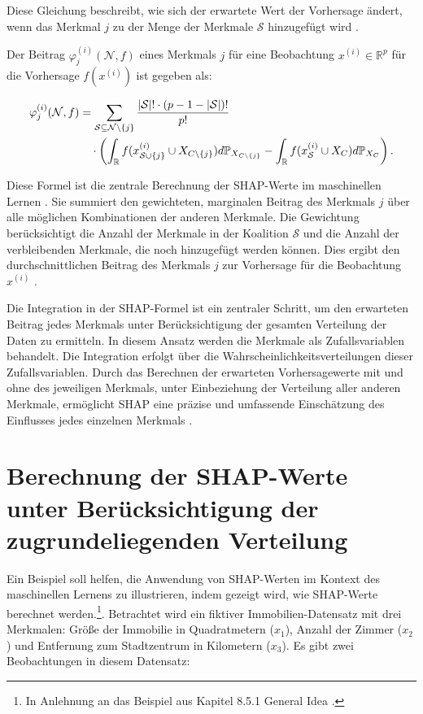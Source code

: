 Diese Gleichung beschreibt, wie sich der erwartete Wert der Vorhersage ändert, wenn das Merkmal $j$ zu der Menge der Merkmale $\mathcal{S}$ hinzugefügt wird \cite[S. 29]{Molnar_2023}.

Der Beitrag $\varphi_j^{(i)}(\mathcal{N}, f)$ eines Merkmals $j$ für eine Beobachtung $x^{(i)} \in \mathbb{R}^{p}$ für die Vorhersage $f(x^{(i)})$ ist gegeben als:

\begin{align}
    \label{eq:shap-eq}
    \varphi^{(i)}_{j} (\mathcal{N}, f) &= \sum_{\mathcal{S} \subseteq \mathcal{N} \setminus \{j\}} \frac{|\mathcal{S}|! \cdot (p - 1 - |\mathcal{S}|)!}{p!} \\ \notag
    &\quad \cdot \left( \int_{\mathbb{R}} f(x^{(i)}_{\mathcal{S} \cup \{j\}} \cup X_{C \setminus \{j\}}) d\mathbb{P}_{X_{C \setminus \{j\}}} -
    \int_{\mathbb{R}} f(x^{(i)}_{\mathcal{S}} \cup X_{C}) d\mathbb{P}_{X_{C}} \right).
\end{align}

Diese Formel ist die zentrale Berechnung der SHAP-Werte im maschinellen Lernen \cite[S. 29]{Molnar_2023}. 
Sie summiert den gewichteten, marginalen Beitrag des Merkmals $j$ über alle möglichen Kombinationen der anderen Merkmale. 
Die Gewichtung berücksichtigt die Anzahl der Merkmale in der Koalition $\mathcal{S}$ und die Anzahl der verbleibenden Merkmale, 
die noch hinzugefügt werden können. Dies ergibt den durchschnittlichen Beitrag des Merkmals $j$ zur Vorhersage für die 
Beobachtung $x^{(i)}$ \cite[S. 30]{Molnar_2023}.

Die Integration in der SHAP-Formel ist ein zentraler Schritt, um den erwarteten Beitrag jedes Merkmals unter 
Berücksichtigung der gesamten Verteilung der Daten zu ermitteln. 
In diesem Ansatz werden die Merkmale als Zufallsvariablen behandelt. Die Integration erfolgt über 
die Wahrscheinlichkeitsverteilungen dieser Zufallsvariablen.
Durch das Berechnen der erwarteten Vorhersagewerte mit 
und ohne des jeweiligen Merkmals, unter Einbeziehung der Verteilung aller anderen Merkmale, 
ermöglicht SHAP eine präzise und umfassende Einschätzung des Einflusses jedes einzelnen Merkmals \cite[S. 28]{Molnar_2023}.


\section{Berechnung der SHAP-Werte unter Berücksichtigung der zugrundeliegenden Verteilung}
\label{sec:example}

Ein Beispiel soll helfen, die Anwendung von SHAP-Werten im 
Kontext des maschinellen Lernens zu illustrieren, indem gezeigt wird, wie SHAP-Werte berechnet werden.\footnote{In Anlehnung an das Beispiel aus Kapitel 8.5.1 \glqq{}General Idea\grqq{} \cite[S.215f]{Molnar_2022}.}. 
Betrachtet wird ein fiktiver Immobilien-Datensatz mit drei Merkmalen: Größe der Immobilie in Quadratmetern ($x_1$), Anzahl der Zimmer ($x_2$) 
und Entfernung zum Stadtzentrum in Kilometern ($x_3$). Es gibt zwei Beobachtungen in diesem Datensatz:

